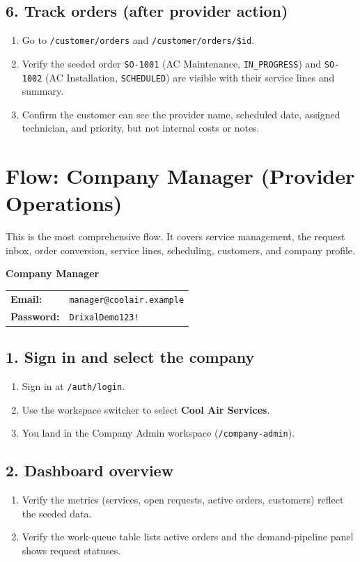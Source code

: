 \documentclass[11pt,a4paper]{article}
\makeatletter
\newcommand{\account}[3]{%
  \begin{tcolorbox}[colback=drixalsurface, colframe=drixalblue, boxrule=0.8pt, left=10pt, right=10pt, top=8pt, bottom=8pt, breakable]
    \textbf{\color{drixalblue}#1}\\
    \begin{tabular}{@{}ll}
      \textbf{Email:} & \texttt{#2} \\
      \textbf{Password:} & \texttt{#3} \\
    \end{tabular}
  \end{tcolorbox}
}
\makeatother
\begin{document}
\subsection{6. Track orders (after provider action)}
\begin{enumerate}[leftmargin=2em, itemsep=2pt]
  \item Go to \texttt{/customer/orders} and \texttt{/customer/orders/\$id}.
  \item Verify the seeded order \texttt{SO-1001} (AC Maintenance, \texttt{IN\_PROGRESS}) and \texttt{SO-1002} (AC Installation, \texttt{SCHEDULED}) are visible with their service lines and summary.
  \item Confirm the customer can see the provider name, scheduled date, assigned technician, and priority, but not internal costs or notes.
\end{enumerate}

\section{Flow: Company Manager (Provider Operations)}
\label{sec:flow-manager}

This is the most comprehensive flow. It covers service management, the request inbox, order conversion, service lines, scheduling, customers, and company profile.

\account{Company Manager}{manager@coolair.example}{DrixalDemo123!}

\subsection{1. Sign in and select the company}
\begin{enumerate}[leftmargin=2em, itemsep=2pt]
  \item Sign in at \texttt{/auth/login}.
  \item Use the workspace switcher to select \textbf{Cool Air Services}.
  \item You land in the Company Admin workspace (\texttt{/company-admin}).
\end{enumerate}

\subsection{2. Dashboard overview}
\begin{enumerate}[leftmargin=2em, itemsep=2pt]
  \item Verify the metrics (services, open requests, active orders, customers) reflect the seeded data.
  \item Verify the work-queue table lists active orders and the demand-pipeline panel shows request statuses.
\end{enumerate}
\end{document}
